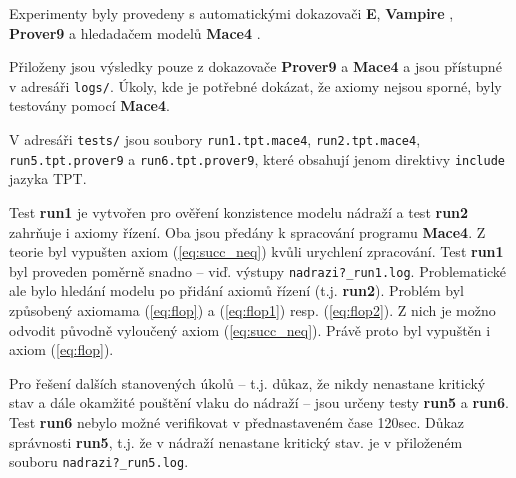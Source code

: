 \documentclass[a4paper,journal]{IEEEtran}
\begin{document}
Experimenty byly provedeny s automatickými dokazovači \textbf{E}\cite{Eprover}, \textbf{Vampire}\cite{Vprover} 
, \textbf{Prover9} \cite{prover9-mace4} a hledadačem modelů \textbf{Mace4} \cite{prover9-mace4}.

Přiloženy jsou výsledky pouze z dokazovače \textbf{Prover9} a \textbf{Mace4} a jsou přístupné v adresáři \texttt{logs/}. 
Úkoly, kde je potřebné dokázat, že axiomy nejsou sporné, byly testovány pomocí \textbf{Mace4}.

V adresáři \texttt{tests/} jsou soubory \texttt{run1.tpt.mace4}, \texttt{run2.tpt.mace4},
\texttt{run5.tpt.prover9} a \texttt{run6.tpt.prover9}, které obsahují jenom direktivy
\texttt{include} jazyka TPT. 

Test \textbf{run1} je vytvořen pro ověření konzistence modelu nádraží a test
\textbf{run2} zahrňuje i axiomy řízení. Oba jsou předány k spracování programu \textbf{Mace4}.
Z teorie byl vypušten axiom (\ref{eq:succ_neq}) kvůli urychlení zpracování. 
Test \textbf{run1} byl proveden poměrně snadno -- viď. výstupy \texttt{nadrazi?\_run1.log}.
Problematické ale bylo hledání modelu po přidání axiomů řízení (t.j. \textbf{run2}). Problém byl způsobený axiomama (\ref{eq:flop}) a
(\ref{eq:flop1}) resp. (\ref{eq:flop2}). Z nich je možno odvodit původně vyloučený axiom (\ref{eq:succ_neq}). 
Právě proto byl vypuštěn i axiom (\ref{eq:flop}). 

Pro řešení dalších stanovených úkolů -- t.j. důkaz, že nikdy nenastane kritický stav a dále okamžité pouštění vlaku do nádraží -- 
jsou určeny testy \textbf{run5} a \textbf{run6}. Test \textbf{run6} nebylo možné verifikovat v přednastaveném čase 120sec. 
Důkaz správnosti \textbf{run5}, t.j. že v nádraží nenastane kritický stav. je v přiloženém souboru \texttt{nadrazi?\_run5.log}.



	
%
\end{document}
